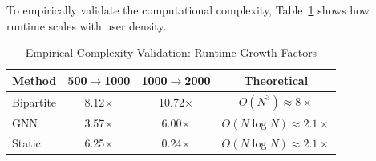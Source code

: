 \documentclass[conference]{IEEEtran}
\begin{document}
\begin{table}[h]
\centering
\caption{Scalability Comparison Across User Densities}
\label{tab:scalability}
\end{table}

To empirically validate the computational complexity, Table~\ref{tab:timing_growth} shows how runtime scales with user density.

\begin{table}[h]
\centering
\caption{Empirical Complexity Validation: Runtime Growth Factors}
\label{tab:timing_growth}
\begin{tabular}{l c c c}
\toprule
\textbf{Method} & \textbf{500$\rightarrow$1000} & \textbf{1000$\rightarrow$2000} & \textbf{Theoretical} \\
\midrule
Bipartite & 8.12$\times$ & 10.72$\times$ & $O(N^3) \approx 8\times$ \\
GNN & 3.57$\times$ & 6.00$\times$ & $O(N \log N) \approx 2.1\times$ \\
Static & 6.25$\times$ & 0.24$\times$ & $O(N \log N) \approx 2.1\times$ \\
\bottomrule
\end{tabular}
\end{table}
\end{document}
